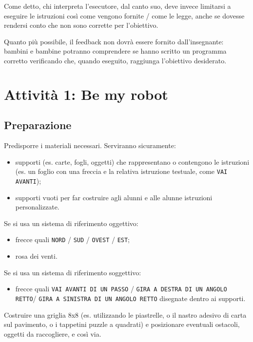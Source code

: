 Come detto, chi interpreta l'esecutore, dal canto suo, deve invece limitarsi a eseguire le istruzioni così come vengono fornite / come le legge, anche se dovesse rendersi conto che non sono corrette per l'obiettivo.

Quanto più possibile, il feedback non dovrà essere fornito dall'insegnante: bambini e bambine potranno comprendere se hanno scritto un programma corretto verificando che, quando eseguito, raggiunga l'obiettivo desiderato.

\section{Attività 1: Be my robot}


\subsection{Preparazione }\label{preparazione-2}

Predisporre i materiali necessari. Serviranno sicuramente:

\begin{itemize}
\item
  supporti (es. carte, fogli, oggetti) che rappresentano o contengono le istruzioni (es. un foglio con una freccia e la relativa istruzione testuale, come \texttt{VAI AVANTI});
\item
  supporti vuoti per far costruire agli alunni e alle alunne istruzioni personalizzate.
\end{itemize}
  Se si usa un sistema di riferimento oggettivo:
\begin{itemize}
  \item frecce quali \texttt{NORD} / \texttt{SUD} / \texttt{OVEST} / \texttt{EST};
\item
  rosa dei venti.
\end{itemize}

Se si usa un sistema di riferimento soggettivo:

\begin{itemize}
\item
  frecce quali \texttt{VAI AVANTI DI UN PASSO} / \texttt{GIRA A DESTRA DI UN ANGOLO RETTO}/ \texttt{GIRA A SINISTRA DI UN ANGOLO RETTO} disegnate dentro ai supporti.
\end{itemize}

Costruire una griglia 8x8 (es. utilizzando le piastrelle, o il nastro adesivo di carta sul pavimento, o i tappetini puzzle a quadrati) e posizionare eventuali ostacoli, oggetti da raccogliere, e così via.

